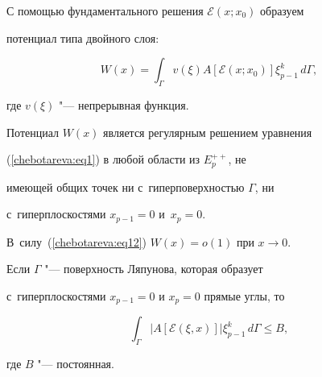 

С помощью фундаментального решения $\mathcal{E}(x;  x_0 )$ образуем


потенциал типа двойного слоя:


\[


W(x) = \int_\Gamma v(\xi )A\left[ {\mathcal{E}(x;  x_0 )}


\right]\xi _{p - 1}^k \,d\Gamma  , 


\]


где $v\left( \xi \right)$ "--- непрерывная функция.





Потенциал $W(x)$ является регулярным решением уравнения


(\ref{chebotareva:eq1}) в любой области из $E_p^{ + + } $,  не


имеющей общих точек ни с~гиперповерхностью $\Gamma $,  ни 


с~гиперплоскостями $x_{p - 1} = 0$ и~$x_p = 0$. 


В~силу~(\ref{chebotareva:eq12}) $W(x) = o(1)$ при $x \to 0$.





\begin{lemma}[1]Если $\Gamma $ "--- поверхность Ляпунова, которая образует 


с~гиперплоскостями $x_{p - 1} = 0$ и $x_p = 0$ прямые углы,  то


\begin{equation}


\label{chebotareva:eq45} \int_\Gamma \bigl| A\left[


{\mathcal{E}(\xi , x)} \right] \bigr|\xi _{p - 1}^k \, d\Gamma \le


B , 


\end{equation}


где $B$ "--- постоянная.


\end{lemma}





